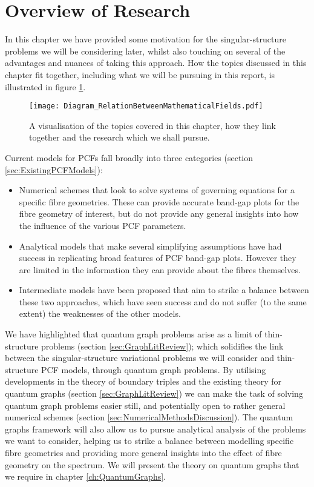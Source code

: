 \section{Overview of Research} \label{sec:ReportOverview}
In this chapter we have provided some motivation for the singular-structure problems we will be considering later, whilst also touching on several of the advantages and nuances of taking this approach.
How the topics discussed in this chapter fit together, including what we will be pursuing in this report, is illustrated in figure \ref{fig:Diagram_RelationBetweenMathematicalFields}.
\begin{figure}[b!]
	\centering
	\texttt{[image: Diagram\_RelationBetweenMathematicalFields.pdf]}
	\caption{\label{fig:Diagram_RelationBetweenMathematicalFields} A visualisation of the topics covered in this chapter, how they link together and the research which we shall pursue.}
\end{figure}
Current models for PCFs fall broadly into three categories (section \ref{sec:ExistingPCFModels}):
\begin{itemize}
	\item Numerical schemes that look to solve systems of governing equations for a specific fibre geometries.
	These can provide accurate band-gap plots for the fibre geometry of interest, but do not provide any general insights into how the influence of the various PCF parameters.
	\item Analytical models that make several simplifying assumptions have had success in replicating broad features of PCF band-gap plots.
	However they are limited in the information they can provide about the fibres themselves.
	\item Intermediate models have been proposed that aim to strike a balance between these two approaches, which have seen success and do not suffer (to the same extent) the weaknesses of the other models.
\end{itemize}
We have highlighted that quantum graph problems arise as a limit of thin-structure problems (section \ref{sec:GraphLitReview}); which solidifies the link between the singular-structure variational problems we will consider and thin-structure PCF models, through quantum graph problems.
By utilising developments in the theory of boundary triples and the existing theory for quantum graphs (section \ref{sec:GraphLitReview}) we can make the task of solving quantum graph problems easier still, and potentially open to rather general numerical schemes (section \ref{sec:NumericalMethodsDiscussion}).
The quantum graphs framework will also allow us to pursue analytical analysis of the problems we want to consider, helping us to strike a balance between modelling specific fibre geometries and providing more general insights into the effect of fibre geometry on the spectrum.
We will present the theory on quantum graphs that we require in chapter \ref{ch:QuantumGraphs}. \newline

